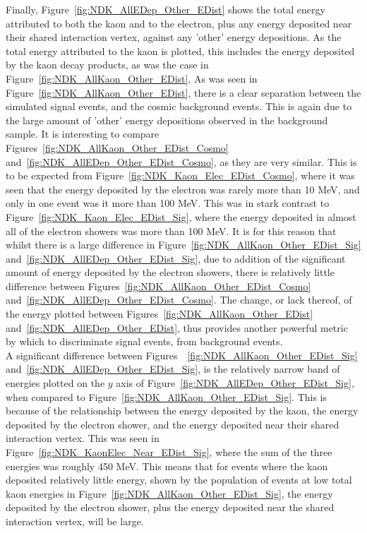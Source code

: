 Finally, Figure~\ref{fig:NDK_AllEDep_Other_EDist} shows the total energy attributed to both the kaon and to the electron, plus any energy deposited near their shared interaction vertex, against any 'other' energy depositions. As the total energy attributed to the kaon is plotted, this includes the energy deposited by the kaon decay products, as was the case in Figure~\ref{fig:NDK_AllKaon_Other_EDist}. As was seen in Figure~\ref{fig:NDK_AllKaon_Other_EDist}, there is a clear separation between the simulated signal events, and the cosmic background events. This is again due to the large amount of 'other' energy depositions observed in the background sample. It is interesting to compare Figures~\ref{fig:NDK_AllKaon_Other_EDist_Cosmo} and~\ref{fig:NDK_AllEDep_Other_EDist_Cosmo}, as they are very similar. This is to be expected from Figure~\ref{fig:NDK_Kaon_Elec_EDist_Cosmo}, where it was seen that the energy deposited by the electron was rarely more than 10 MeV, and only in one event was it more than 100 MeV. This was in stark contrast to Figure~\ref{fig:NDK_Kaon_Elec_EDist_Sig}, where the energy deposited in almost all of the electron showers was more than 100 MeV. It is for this reason that whilst there is a large difference in Figure~\ref{fig:NDK_AllKaon_Other_EDist_Sig} and~\ref{fig:NDK_AllEDep_Other_EDist_Sig}, due to addition of the significant amount of energy deposited by the electron showers, there is relatively little difference between Figures~\ref{fig:NDK_AllKaon_Other_EDist_Cosmo} and~\ref{fig:NDK_AllEDep_Other_EDist_Cosmo}. The change, or lack thereof, of the energy plotted between Figures~\ref{fig:NDK_AllKaon_Other_EDist} and~\ref{fig:NDK_AllEDep_Other_EDist}, thus provides another powerful metric by which to discriminate signal events, from background events. \\

A significant difference between Figures~~\ref{fig:NDK_AllKaon_Other_EDist_Sig} and~\ref{fig:NDK_AllEDep_Other_EDist_Sig}, is the relatively narrow band of energies plotted on the $y$ axis of Figure~\ref{fig:NDK_AllEDep_Other_EDist_Sig}, when compared to Figure~\ref{fig:NDK_AllKaon_Other_EDist_Sig}. This is because of the relationship between the energy deposited by the kaon, the energy deposited by the electron shower, and the energy deposited near their shared interaction vertex. This was seen in Figure~\ref{fig:NDK_KaonElec_Near_EDist_Sig}, where the sum of the three energies was roughly 450 MeV. This means that for events where the kaon deposited relatively little energy, shown by the population of events at low total kaon energies in Figure~\ref{fig:NDK_AllKaon_Other_EDist_Sig}, the energy deposited by the electron shower, plus the energy deposited near the shared interaction vertex, will be large. \\

